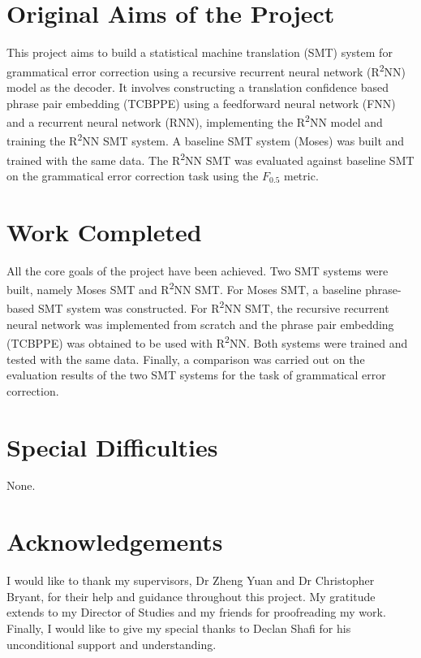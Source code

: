 \documentclass[12pt,a4paper,twoside,openright]{report}
\begin{document}

\section*{Original Aims of the Project}
This project aims to build a statistical machine translation (SMT) system for grammatical error correction using a recursive recurrent neural network (R\textsuperscript{2}NN) model as the decoder. It involves constructing a translation confidence based phrase pair embedding (TCBPPE) using a feedforward neural network (FNN) and a recurrent neural network (RNN), implementing the R\textsuperscript{2}NN model and training the R\textsuperscript{2}NN SMT system. A baseline SMT system (Moses) was built and trained with the same data. The R\textsuperscript{2}NN SMT was evaluated against baseline SMT on the grammatical error correction task using the $F_{0.5}$ metric.

\section*{Work Completed}
All the core goals of the project have been achieved. Two SMT systems were built, namely Moses SMT and R\textsuperscript{2}NN SMT. For Moses SMT, a baseline phrase-based SMT system was constructed. For R\textsuperscript{2}NN SMT, the recursive recurrent neural network was implemented from scratch and the phrase pair embedding (TCBPPE) was obtained to be used with R\textsuperscript{2}NN. Both systems were trained and tested with the same data. Finally, a comparison was carried out on the evaluation results of the two SMT systems for the task of grammatical error correction.

\section*{Special Difficulties}
None.

\section*{Acknowledgements}
I would like to thank my supervisors, Dr Zheng Yuan and Dr Christopher Bryant, for their help and guidance throughout this project. My gratitude extends to my Director of Studies and my friends for proofreading my work. Finally, I would like to give my special thanks to Declan Shafi for his unconditional support and understanding.
\end{document}
